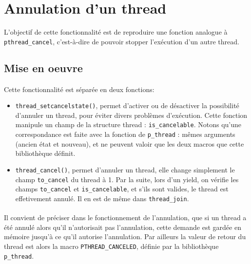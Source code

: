 \section{Annulation d'un thread}

\paragraph{}
L'objectif de cette fonctionnalité est de reproduire une fonction analogue à \texttt{pthread\_cancel}, c'est-à-dire de pouvoir stopper l'exécution d'un autre thread.

\subsection{Mise en oeuvre}

\paragraph{}
Cette fonctionnalité est séparée en deux fonctions:
\begin{itemize}
\item \texttt{thread\_setcancelstate()}, permet d'activer ou de désactiver la possibilité d'annuler un thread, pour éviter divers problèmes d'exécution. Cette fonction manipule un champ de la structure thread : \texttt{is\_cancelable}. Notons qu'une correspondance est faite avec la fonction de \texttt{p\_thread} : mêmes arguments (ancien état et nouveau), et ne peuvent valoir que les deux macros que cette bibliothèque définit.
\item \texttt{thread\_cancel()}, permet d'annuler un thread, elle change simplement le champ \texttt{to\_cancel} du thread à 1. Par la suite, lors d'un yield, on vérifie les champs \texttt{to\_cancel} et \texttt{is\_cancelable}, et s'ils sont valides, le thread est effetivement annulé. Il en est de même dans \texttt{thread\_join}.
\end{itemize}

\paragraph{}
Il convient de préciser dans le fonctionnement de l'annulation, que si un thread a été annulé alors qu'il n'autorisait pas l'annulation, cette demande est gardée en mémoire jusqu'à ce qu'il autorise l'annulation. Par ailleurs la valeur de retour du thread est alors la macro \verb!PTHREAD_CANCELED!, définie par la bibliothèque \texttt{p\_thread}.

